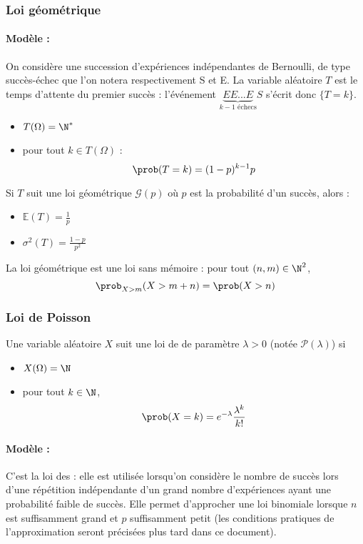 \subsubsection{Loi géométrique}
\paragraph{Modèle :} On considère une succession  d'expériences indépendantes de Bernoulli, de type succès-échec que l'on notera respectivement S et E. La variable aléatoire $T$ est le temps d'attente du premier succès : l'événement $\underbrace{EE...E}_{k-1 \text{ échecs}}S  $ s'écrit donc $\{T=k\}$.

\begin{itemize}
	\item $T(\Omega) = \N^*$ 
	\item pour tout $k \in T(\Omega)$ :
	$$\prob(T=k)=(1-p)^{k-1}p$$
\end{itemize}

\begin{proposition}{}{}
	Si $T$ suit une loi géométrique $\mathscr{G}(p)$ où $p$ est la probabilité d'un succès, alors :
	\begin{itemize}
		\item $\mathbb{E}(T) = \frac{1}{p}$
		\item $\sigma^2(T)=\frac{1-p}{p^2}$
	\end{itemize}
\end{proposition}

\begin{theoreme}{}{}
	La loi géométrique est une loi sans mémoire : pour tout $(n,m) \in \N^2$, 
	$$\prob_{X>m}(X > m+n)=\prob(X>n)$$
\end{theoreme}

\subsubsection{Loi de Poisson}
\begin{definition}{}{}
	Une variable aléatoire $X$ suit une loi de  de paramètre $\lambda >0$ (notée $\mathscr{P}(\lambda)$) si 
	\begin{itemize}
		\item $X(\Omega)=\N$ 
		\item pour tout $k \in \N$,  $$\prob(X=k)=e^{-\lambda}\frac{\lambda^k}{k!}$$
	\end{itemize}
\end{definition}

\paragraph{Modèle :} C'est la loi des  : elle est utilisée lorsqu'on considère le nombre de succès lors d'une répétition indépendante d'un grand nombre d'expériences ayant une probabilité faible de succès. Elle permet  d'approcher une loi binomiale lorsque $n$ est suffisamment grand et $p$ suffisamment petit (les conditions pratiques de l'approximation seront précisées plus tard dans ce document).

